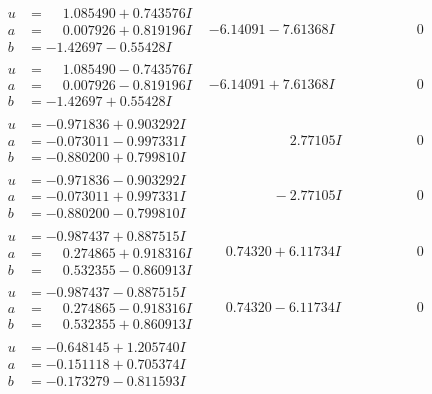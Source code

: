 \documentclass[1p]{elsarticle_modified}
\theoremstyle{definition}
\begin{document}
$$\begin{array}{c|c|c}
\begin{aligned}
u &= \phantom{-}1.085490 + 0.743576 I \\
a &= \phantom{-}0.007926 + 0.819196 I \\
b &= -1.42697 - 0.55428 I\end{aligned}
 & -6.14091 - 7.61368 I & \phantom{-0.000000 } 0 \\ \hline\begin{aligned}
u &= \phantom{-}1.085490 - 0.743576 I \\
a &= \phantom{-}0.007926 - 0.819196 I \\
b &= -1.42697 + 0.55428 I\end{aligned}
 & -6.14091 + 7.61368 I & \phantom{-0.000000 } 0 \\ \hline\begin{aligned}
u &= -0.971836 + 0.903292 I \\
a &= -0.073011 - 0.997331 I \\
b &= -0.880200 + 0.799810 I\end{aligned}
 & \phantom{-0.000000 -}2.77105 I & \phantom{-0.000000 } 0 \\ \hline\begin{aligned}
u &= -0.971836 - 0.903292 I \\
a &= -0.073011 + 0.997331 I \\
b &= -0.880200 - 0.799810 I\end{aligned}
 & \phantom{-0.000000 } -2.77105 I & \phantom{-0.000000 } 0 \\ \hline\begin{aligned}
u &= -0.987437 + 0.887515 I \\
a &= \phantom{-}0.274865 + 0.918316 I \\
b &= \phantom{-}0.532355 - 0.860913 I\end{aligned}
 & \phantom{-}0.74320 + 6.11734 I & \phantom{-0.000000 } 0 \\ \hline\begin{aligned}
u &= -0.987437 - 0.887515 I \\
a &= \phantom{-}0.274865 - 0.918316 I \\
b &= \phantom{-}0.532355 + 0.860913 I\end{aligned}
 & \phantom{-}0.74320 - 6.11734 I & \phantom{-0.000000 } 0 \\ \hline\begin{aligned}
u &= -0.648145 + 1.205740 I \\
a &= -0.151118 + 0.705374 I \\
b &= -0.173279 - 0.811593 I\end{aligned}

\end{array}$$
\end{document}
